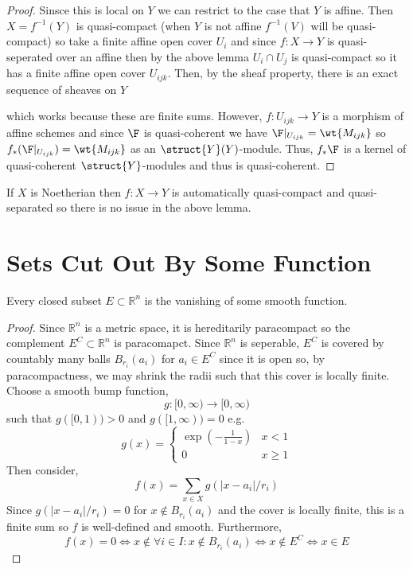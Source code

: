 \documentclass[12pt]{article}
\begin{document}
\begin{proof}
Sinsce this is local on $Y$ we can restrict to the case that $Y$ is affine. Then   $X = f^{-1}(Y)$ is quasi-compact (when $Y$ is not affine $f^{-1}(V)$ will be quasi-compact) so take a finite affine open cover $U_i$ and since $f : X \to Y$ is quasi-seperated over an affine then by the above lemma $U_i \cap U_j$ is quasi-compact so it has a finite affine open cover $U_{ijk}$. Then, by the sheaf property, there is an exact sequence of sheaves on $Y$
\begin{center}
\end{center}
which works because these are finite sums. However, $f : U_{ijk} \to Y$ is a morphism of affine schemes and since $\F$ is quasi-coherent we have $\F |_{U_{ijk}} = \wt{M_{ijk}}$ so $f_* (\F|_{U_{ijk}}) = \wt{M_{ijk}}$ as an $\struct{Y}(Y)$-module. Thus, $f_* \F$ is a kernel of quasi-coherent $\struct{Y}$-modules and thus is quasi-coherent. 
\end{proof}

\begin{rmk}
If $X$ is Noetherian then $f : X \to Y$ is automatically quasi-compact and quasi-separated so there is no issue in the above lemma.
\end{rmk}

\section{Sets Cut Out By Some Function}

\newcommand{\R}{\mathbb{R}}

\begin{theorem}
Every closed subset $E \subset \R^n$ is the vanishing of some smooth function.
\end{theorem}

\begin{proof}
Since $\R^n$ is a metric space, it is hereditarily paracompact so the complement $E^C \subset \R^n$ is paracomapct. Since $\R^n$ is seperable, $E^C$ is covered by countably many balls $B_{r_i}(a_i)$ for $a_i \in E^C$ since it is open so, by paracompactness, we may shrink the radii such that this cover is locally finite. Choose a smooth bump function, 
\[ g : [0, \infty) \to [0, \infty) \]
such that $g([0, 1)) > 0$ and $g([1, \infty)) = 0$ e.g. 
\[ g(x) = 
\begin{cases}
\exp{\left( - \frac{1}{1 - x} \right)} & x < 1
\\
0 & x \ge 1
\end{cases} \]
Then consider,
\[ f(x) = \sum_{x \in X} g(|x - a_i|/r_i) \]
Since $g(|x - a_i|/r_i) = 0$ for $x \notin B_{r_i}(a_i)$ and the cover is locally finite, this is a finite sum so $f$ is well-defined and smooth. Furthermore, 
\[ f(x) = 0 \iff x \notin \forall i \in I : x \notin B_{r_i}(a_i) \iff x \notin E^C \iff x \in E \]
\end{proof}
\end{document}

